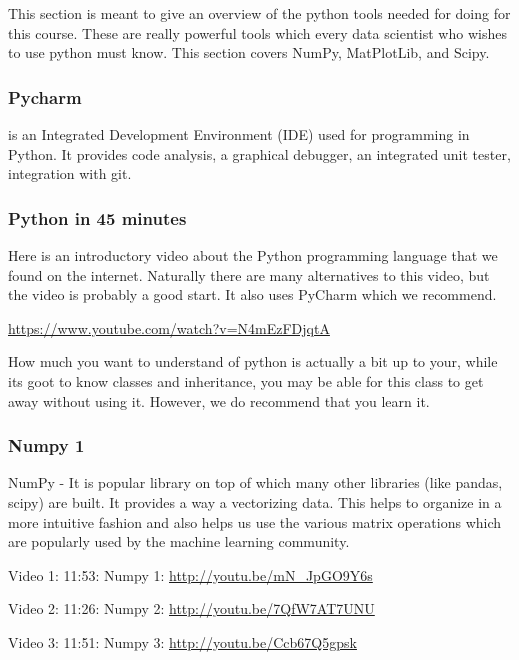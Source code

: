 This section is meant to give an overview of the python tools needed for
doing for this course. These are really powerful tools which every data
scientist who wishes to use python must know. This section covers NumPy,
MatPlotLib, and Scipy.

\subsubsection{Pycharm}\label{pycharm}

is an Integrated Development Environment (IDE) used for programming in
Python. It provides code analysis, a graphical debugger, an integrated
unit tester, integration with git.


\subsubsection{Python in 45 minutes}\label{python-in-45-minutes}

Here is an introductory video about the Python programming language that
we found on the internet. Naturally there are many alternatives to this
video, but the video is probably a good start. It also uses PyCharm
which we recommend.

\url{https://www.youtube.com/watch?v=N4mEzFDjqtA}

How much you want to understand of python is actually a bit up to your,
while its goot to know classes and inheritance, you may be able for this
class to get away without using it. However, we do recommend that you
learn it.

\subsubsection{Numpy 1}\label{numpy-1}

NumPy - It is popular library on top of which many other libraries (like
pandas, scipy) are built. It provides a way a vectorizing data. This
helps to organize in a more intuitive fashion and also helps us use the
various matrix operations which are popularly used by the machine
learning community.

Video 1: 11:53: Numpy 1: \url{http://youtu.be/mN_JpGO9Y6s}

Video 2: 11:26: Numpy 2: \url{http://youtu.be/7QfW7AT7UNU}

Video 3: 11:51: Numpy 3: \url{http://youtu.be/Ccb67Q5gpsk}

